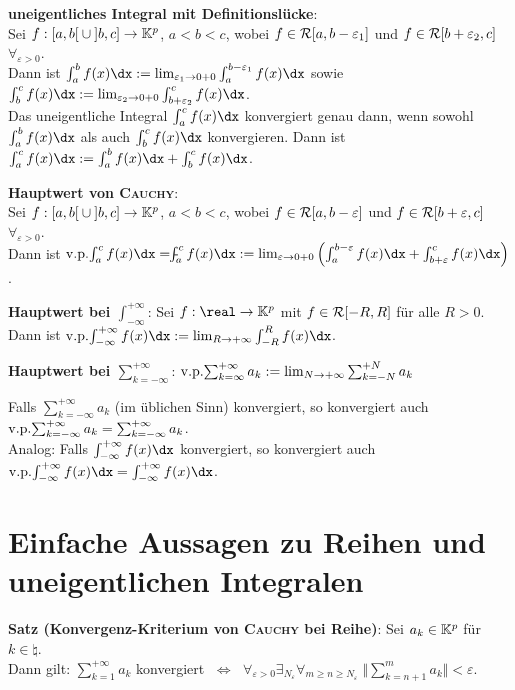 \linie

\textbf{uneigentliches Integral mit Definitionslücke}: \\
Sei $f: \left[a,b\right[ \cup \left]b,c\right] \rightarrow \mathbb{K}^p$,
$a < b < c$, wobei $f \in \mathcal{R}[a, b - \varepsilon_1]$ und
$f \in \mathcal{R}[b + \varepsilon_2, c]$ $\forall_{\varepsilon > 0}$. \\
Dann ist $\int_a^b f(x)\dx :=
\lim_{\varepsilon_1 \to 0+0} \int_a^{b-\varepsilon_1} f(x)\dx$ sowie
$\int_b^c f(x)\dx :=
\lim_{\varepsilon_2 \to 0+0} \int_{b+\varepsilon_2}^c f(x)\dx$. \\
Das uneigentliche Integral $\int_a^c f(x)\dx$ konvergiert genau dann, wenn
sowohl $\int_a^b f(x)\dx$ als auch $\int_b^c f(x)\dx$
konvergieren.
Dann ist $\int_a^c f(x)\dx := \int_a^b f(x)\dx + \int_b^c f(x)\dx$.

\linie

\textbf{Hauptwert von \textsc{Cauchy}}: \\
Sei $f: \left[a,b\right[ \cup \left]b,c\right] \rightarrow \mathbb{K}^p$,
$a < b < c$, wobei $f \in \mathcal{R}[a, b - \varepsilon]$ und
$f \in \mathcal{R}[b + \varepsilon, c]$ $\forall_{\varepsilon > 0}$. \\
Dann ist $\vp\int_a^c f(x)\dx = \intstrich\int_a^c f(x)\dx :=
\lim_{\varepsilon \to 0+0} \left(\int_a^{b-\varepsilon} f(x)\dx +
\int_{b+\varepsilon}^c f(x)\dx\right)$.

\textbf{Hauptwert bei $\int_{-\infty}^{+\infty}$}:
Sei $f: \real \rightarrow \field^p$ mit $f \in \mathcal{R}[-R, R]$ für alle
$R > 0$. \\
Dann ist $\vp\int_{-\infty}^{+\infty} f(x)\dx :=
\lim_{R \to +\infty} \int_{-R}^R f(x)\dx$.

\textbf{Hauptwert bei $\sum_{k=-\infty}^{+\infty}$}:
$\operatorname{v.\!p.\!}\sum_{k=\infty}^{+\infty} a_k := \lim_{N \to +\infty} \sum_{k=-N}^{+N} a_k$

Falls $\sum_{k=-\infty}^{+\infty} a_k$ (im üblichen Sinn) konvergiert,
so konvergiert auch
$\operatorname{v.\!p.\!}\sum_{k=-\infty}^{+\infty} a_k = \sum_{k=-\infty}^{+\infty} a_k$. \\
Analog:
Falls $\int_{-\infty}^{+\infty} f(x)\dx$ konvergiert,
so konvergiert auch
$\vp\int_{-\infty}^{+\infty} f(x)\dx = \int_{-\infty}^{+\infty} f(x)\dx$.

\section{%
    Einfache Aussagen zu Reihen und uneigentlichen Integralen%
}

\textbf{Satz (Konvergenz-Kriterium von \textsc{Cauchy} bei Reihe)}:
Sei $a_k \in \mathbb{K}^p$ für $k \in \natural$. \\
Dann gilt:
$\sum_{k=1}^{+\infty} a_k$ konvergiert $\;\Leftrightarrow\;$
$\forall_{\varepsilon > 0} \exists_{N_\varepsilon}
\forall_{m \ge n \ge N_\varepsilon}\;
\big\Vert \sum_{k=n+1}^m a_k \big\Vert < \varepsilon$.

